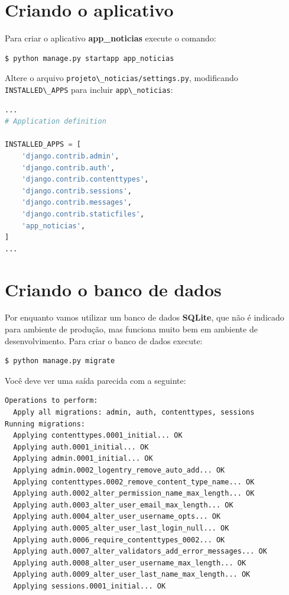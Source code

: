 \documentclass[brazil,a4paper,oneside,openright,parskip=full]{book}
\newcommand{\passthrough}[1]{#1}
\begin{document}
\hypertarget{criando-o-aplicativo}{%
\section{Criando o aplicativo}\label{criando-o-aplicativo}}

Para criar o aplicativo \textbf{app\_noticias} execute o comando:

\begin{lstlisting}[language=sh, style=nonumber]
$ python manage.py startapp app_noticias
\end{lstlisting}

Altere o arquivo
\passthrough{\lstinline!projeto\_noticias/settings.py!}, modificando
\passthrough{\lstinline!INSTALLED\_APPS!} para incluir
\passthrough{\lstinline!app\_noticias!}:

\begin{lstlisting}[language=Python]
...
# Application definition

INSTALLED_APPS = [
    'django.contrib.admin',
    'django.contrib.auth',
    'django.contrib.contenttypes',
    'django.contrib.sessions',
    'django.contrib.messages',
    'django.contrib.staticfiles',
    'app_noticias',
]
...
\end{lstlisting}

\hypertarget{criando-o-banco-de-dados}{%
\section{Criando o banco de dados}\label{criando-o-banco-de-dados}}

Por enquanto vamos utilizar um banco de dados \textbf{SQLite}, que não é
indicado para ambiente de produção, mas funciona muito bem em ambiente
de desenvolvimento. Para criar o banco de dados execute:

\begin{lstlisting}[language=sh, style=nonumber]
$ python manage.py migrate
\end{lstlisting}

Você deve ver uma saída parecida com a seguinte:

\begin{lstlisting}[style=nonumber]
Operations to perform:
  Apply all migrations: admin, auth, contenttypes, sessions
Running migrations:
  Applying contenttypes.0001_initial... OK
  Applying auth.0001_initial... OK
  Applying admin.0001_initial... OK
  Applying admin.0002_logentry_remove_auto_add... OK
  Applying contenttypes.0002_remove_content_type_name... OK
  Applying auth.0002_alter_permission_name_max_length... OK
  Applying auth.0003_alter_user_email_max_length... OK
  Applying auth.0004_alter_user_username_opts... OK
  Applying auth.0005_alter_user_last_login_null... OK
  Applying auth.0006_require_contenttypes_0002... OK
  Applying auth.0007_alter_validators_add_error_messages... OK
  Applying auth.0008_alter_user_username_max_length... OK
  Applying auth.0009_alter_user_last_name_max_length... OK
  Applying sessions.0001_initial... OK
\end{lstlisting}
\end{document}
